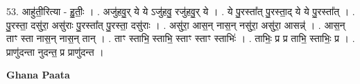 \documentclass[17pt]{extarticle}
\begin{document}
53. आहु॑ती॒रित्या - हु॒तीः॒ । . अजु॑हवु॒र् ये ये ऽजु॑हवु॒ रजु॑हवु॒र् ये । . ये पु॒रस्ता᳚त् पु॒रस्ता॒द् ये ये पु॒रस्ता᳚त् । . पु॒रस्ता॒ दसु॑रा॒ असु॑राः पु॒रस्ता᳚त् पु॒रस्ता॒ दसु॑राः । . असु॑रा॒ आस॒न् नास॒न् नसु॑रा॒ असु॑रा॒ आसन्न्॑ । . आस॒न् ताꣳ स्ता नास॒न् नास॒न् तान् । . ताꣳ स्ताभि॒ स्ताभि॒ स्ताꣳ स्ताꣳ स्ताभिः॑ । . ताभिः॒ प्र प्र ताभि॒ स्ताभिः॒ प्र । . प्राणु॑दन्ता नुदन्त॒ प्र प्राणु॑दन्त । \newline

\textbf{Ghana Paata } \newline
\end{document}
